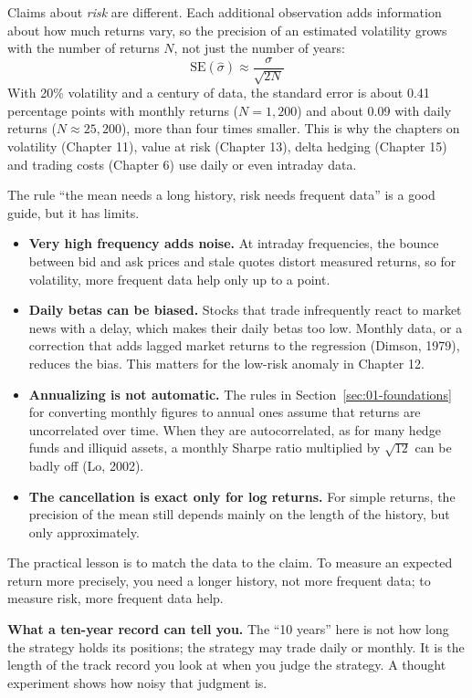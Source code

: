 Claims about \emph{risk} are different. Each additional observation adds information about how much returns vary, so the precision of an estimated volatility grows with the number of returns $N$, not just the number of years:
\begin{equation}
  \mathrm{SE}(\hat{\sigma}) \approx \frac{\sigma}{\sqrt{2N}} \nonumber
\end{equation}
With 20\% volatility and a century of data, the standard error is about 0.41 percentage points with monthly returns ($N = 1{,}200$) and about 0.09 with daily returns ($N \approx 25{,}200$), more than four times smaller. This is why the chapters on volatility (Chapter 11), value at risk (Chapter 13), delta hedging (Chapter 15) and trading costs (Chapter 6) use daily or even intraday data.

The rule ``the mean needs a long history, risk needs frequent data'' is a good guide, but it has limits.
\begin{itemize}
  \item \textbf{Very high frequency adds noise.} At intraday frequencies, the bounce between bid and ask prices and stale quotes distort measured returns, so for volatility, more frequent data help only up to a point.
  \item \textbf{Daily betas can be biased.} Stocks that trade infrequently react to market news with a delay, which makes their daily betas too low. Monthly data, or a correction that adds lagged market returns to the regression (Dimson, 1979), reduces the bias. This matters for the low-risk anomaly in Chapter 12.
  \item \textbf{Annualizing is not automatic.} The rules in Section~\ref{sec:01-foundations} for converting monthly figures to annual ones assume that returns are uncorrelated over time. When they are autocorrelated, as for many hedge funds and illiquid assets, a monthly Sharpe ratio multiplied by $\sqrt{12}$ can be badly off (Lo, 2002).
  \item \textbf{The cancellation is exact only for log returns.} For simple returns, the precision of the mean still depends mainly on the length of the history, but only approximately.
\end{itemize}

The practical lesson is to match the data to the claim. To measure an expected return more precisely, you need a longer history, not more frequent data; to measure risk, more frequent data help.

\textbf{What a ten-year record can tell you.} The ``10 years'' here is not how long the strategy holds its positions; the strategy may trade daily or monthly. It is the length of the track record you look at when you judge the strategy. A thought experiment shows how noisy that judgment is.

